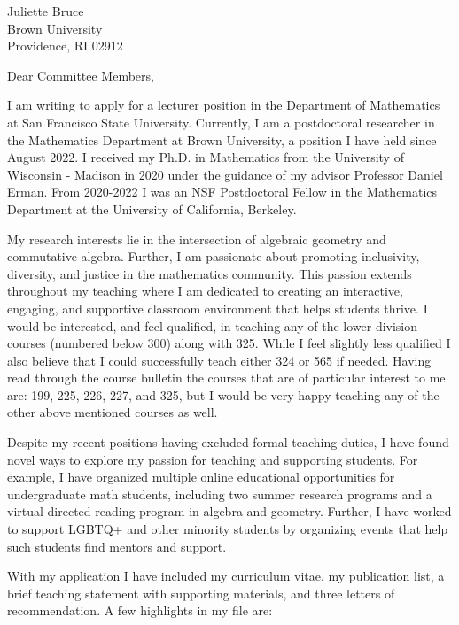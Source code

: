 \documentclass[11pt]{brownletter}
\date{April 5, 2024} %
\begin{document}
\begin{letter}{Juliette Bruce\\ 
               Brown University\\ 
               Providence, RI 02912}

\opening{Dear Committee Members,}

I am writing to apply for a lecturer position in the Department of Mathematics at San Francisco State University. Currently, I am a postdoctoral researcher in the Mathematics Department at Brown University, a position I have held since August 2022. I received my Ph.D. in Mathematics from the University of Wisconsin - Madison in 2020 under the guidance of my advisor Professor Daniel Erman. From 2020-2022 I was an NSF Postdoctoral Fellow in the Mathematics Department at the University of California, Berkeley.



My research interests lie in the intersection of algebraic geometry and commutative algebra. Further, I am passionate about promoting inclusivity, diversity, and justice in the mathematics community. This passion extends throughout my teaching where I am dedicated to creating an interactive, engaging, and supportive classroom environment that helps students thrive. I would be interested, and feel qualified, in teaching any of the lower-division courses (numbered below 300) along with 325. While I feel slightly less qualified I also believe that I could successfully teach either  324 or 565 if needed. Having read through the course bulletin the courses that are of particular interest to me are: 199, 225, 226, 227, and 325, but I would be very happy teaching any of the other above mentioned courses as well. 

Despite my recent positions having excluded formal teaching duties, I have found novel ways to explore my passion for teaching and supporting students. For example, I have organized multiple online educational opportunities for undergraduate math students, including two summer research programs and a virtual directed reading program in algebra and geometry. Further, I have worked to support LGBTQ+ and other minority students by organizing events that help such students find mentors and support.  

With my application I have included my curriculum vitae, my publication list, a brief teaching statement with supporting materials, and three letters of recommendation. A few highlights in my file are:
\begin{itemize}


\end{itemize}
\end{letter}
\end{document}
